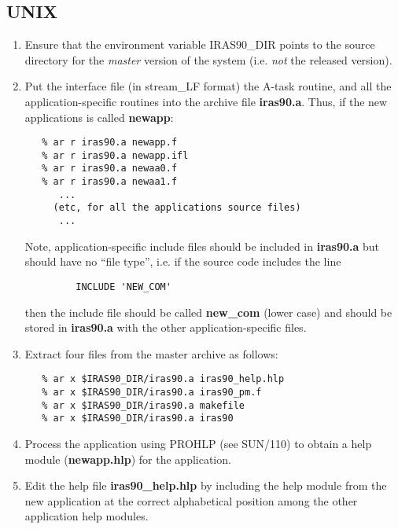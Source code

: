 \subsection{UNIX}
\begin{enumerate}
\item Ensure that the environment variable {\small IRAS90\_DIR} points to the
source directory for the {\em master} version of the system (i.e. {\em not} the
released version).

\item Put the interface file (in stream\_LF format) the A-task routine, and all
the application-specific routines into the archive file {\bf iras90.a}. Thus, if
the new applications is called {\bf newapp}: 

\small
\begin{verbatim}
   % ar r iras90.a newapp.f
   % ar r iras90.a newapp.ifl
   % ar r iras90.a newaa0.f
   % ar r iras90.a newaa1.f
      ...
     (etc, for all the applications source files)
      ...
\end{verbatim}
\normalsize

Note, application-specific include files should be included in {\bf iras90.a} but 
should have no ``file type'', i.e. if the source code includes the line

\small 
\begin{verbatim}
         INCLUDE 'NEW_COM'
\end{verbatim}
\normalsize

then the include file should be called {\bf new\_com} (lower case) and should be 
stored in {\bf iras90.a} with the other application-specific files.


\item Extract four files from the master archive as follows:

\small
\begin{verbatim}
   % ar x $IRAS90_DIR/iras90.a iras90_help.hlp
   % ar x $IRAS90_DIR/iras90.a iras90_pm.f
   % ar x $IRAS90_DIR/iras90.a makefile
   % ar x $IRAS90_DIR/iras90.a iras90
\end{verbatim}
\normalsize

\item Process the application using {\small PROHLP} (see SUN/110) to obtain
a help module ({\bf newapp.hlp}) for the application.

\item Edit the help file {\bf iras90\_help.hlp} by including the help module
from the new application at the correct alphabetical position among the other
application help modules. 


\end{enumerate}
